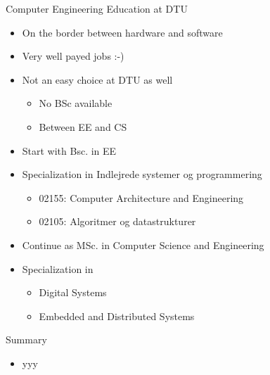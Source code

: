 \begin{frame}[fragile]{Computer Engineering Education at DTU}
\begin{itemize}
\item On the border between hardware and software
\item Very well payed jobs :-)
\item Not an easy choice at DTU as well
\begin{itemize}
\item No BSc available
\item Between EE and CS
\end{itemize}
\item Start with Bsc. in EE
\item Specialization in Indlejrede systemer og programmering
\begin{itemize}
\item 02155: Computer Architecture and Engineering
\item 02105: Algoritmer og datastrukturer
\end{itemize}
\item Continue as MSc. in Computer Science and Engineering
\item Specialization in
\begin{itemize}
\item Digital Systems
\item Embedded and Distributed Systems
\end{itemize}
\end{itemize}
\end{frame}

\begin{frame}[fragile]{Summary}
\begin{itemize}
\item yyy
\end{itemize}
\end{frame}





